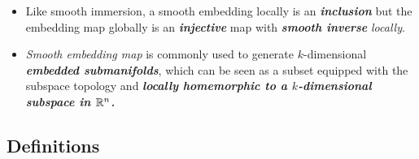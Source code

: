 \documentclass[11pt]{article}
\begin{document}
\begin{itemize}
\begin{remark}
\begin{enumerate}
\begin{itemize}
\item Like smooth immersion, a smooth embedding locally is an \emph{\textbf{inclusion}} but the embedding map globally is an \emph{\textbf{injective}} map with \emph{\textbf{smooth inverse}} \emph{locally}.

\item \emph{Smooth embedding map} is commonly used to generate $k$-dimensional \emph{\textbf{embedded submanifolds}}, which can be seen as a subset equipped with the subspace topology and \emph{\textbf{locally homemorphic to a $k$-dimensional subspace in ${\mathbb R}^{n}$.}}
\end{itemize}

\end{enumerate}
\end{remark}
\end{itemize}
\newpage
\subsection{Definitions}
\end{document}

